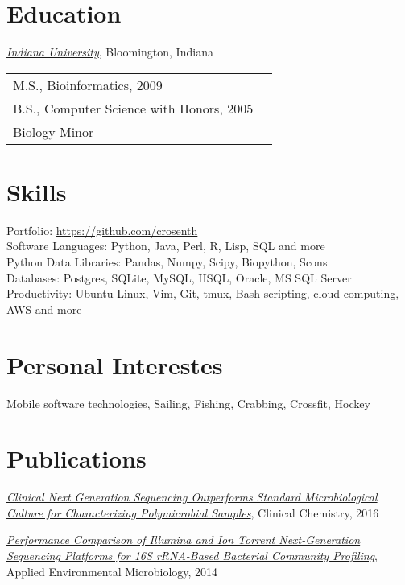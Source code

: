 \documentclass{res}
\begin{document}
\begin{resume}
\section{Education}
\href{http://www.iub.edu/}{\textit{Indiana University}}, Bloomington, Indiana\\
\begin{tabular}{p{10cm} l} 
M.S., Bioinformatics, 2009\\
B.S., Computer Science with Honors, 2005\\
Biology Minor
\end{tabular}

\section{Skills}
Portfolio: \url{https://github.com/crosenth}\\
Software Languages: Python, Java, Perl, R, Lisp, SQL and more\\
Python Data Libraries: Pandas, Numpy, Scipy, Biopython, Scons\\
Databases: Postgres, SQLite, MySQL, HSQL, Oracle, MS SQL Server\\
Productivity: Ubuntu Linux, Vim, Git, tmux, Bash scripting, cloud computing, AWS and more

\section{Personal Interestes}
Mobile software technologies, Sailing, Fishing, Crabbing, Crossfit, Hockey

\section{Publications}
\renewcommand{\section}[2]{}
\begin{thebibliography}{4}
    \href{http://clinchem.aaccjnls.org/content/62/11/1465}
         {\textit{Clinical Next Generation Sequencing Outperforms Standard 
                  Microbiological Culture for Characterizing 
                  Polymicrobial Samples}},
         Clinical Chemistry, 2016

    \href{http://aem.asm.org/content/80/24/7583}
         {\textit{Performance Comparison of Illumina and Ion Torrent 
                  Next-Generation Sequencing Platforms for 16S rRNA-Based 
                  Bacterial Community Profiling}},
         Applied Environmental Microbiology, 2014


\end{thebibliography}
\end{resume}
\end{document}
